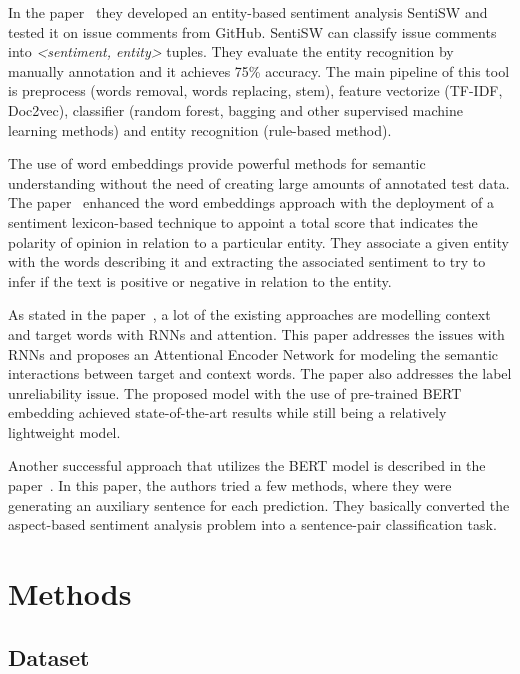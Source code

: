 \documentclass[11pt,a4paper]{article}
\begin{document}
In the paper~\cite{ding2018entity} they developed an entity-based sentiment analysis SentiSW and tested it on issue comments from GitHub.
SentiSW can classify issue comments into \emph{<sentiment, entity>} tuples.
They evaluate the entity recognition by manually annotation and it achieves 75\% accuracy.
The main pipeline of this tool is preprocess (words removal, words replacing, stem), feature vectorize (TF-IDF, Doc2vec), classifier (random forest, bagging and other supervised machine learning methods) and entity recognition (rule-based method).

The use of word embeddings provide powerful methods for semantic understanding without the need of creating large amounts of annotated test data.
The paper~\cite{sweeney2017multi} enhanced the word embeddings approach with the  deployment of a sentiment lexicon-based technique to appoint a total score that indicates the polarity of opinion in relation to a particular entity.
They associate a given entity with the words describing it and extracting the associated sentiment to try to infer if the text is positive or negative in relation to the entity.

As stated in the paper~\cite{song2019attentional}, a lot of the existing approaches are modelling context and target words with RNNs and attention.
This paper addresses the issues with RNNs and proposes an Attentional Encoder Network for modeling the semantic interactions between target and context words.
The paper also addresses the label unreliability issue.
The proposed model with the use of pre-trained BERT embedding achieved state-of-the-art results while still being a relatively lightweight model.

Another successful approach that utilizes the BERT model is described in the paper~\cite{sun2019utilizing}.
In this paper, the authors tried a few methods, where they were generating an auxiliary sentence for each prediction.
They basically converted the aspect-based sentiment analysis problem into a sentence-pair classification task.



\section{Methods}

\subsection{Dataset}
\end{document}
